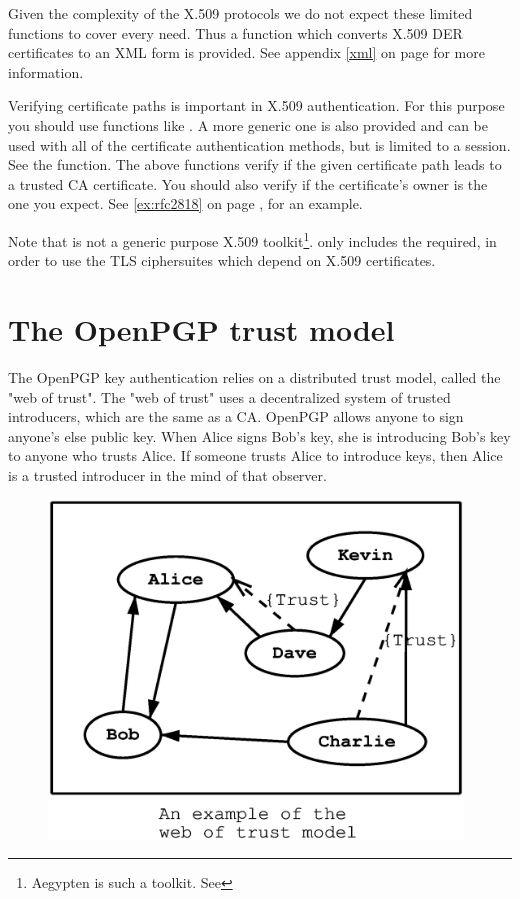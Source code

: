 Given the complexity of the X.509 protocols we do not expect these limited 
functions to cover every need. Thus a function which converts X.509 DER certificates
to an XML form is provided. See appendix \ref{xml} on page \pageref{xml} for
more information.


\par
Verifying certificate paths is important 
in X.509 authentication. For this purpose you should use functions like
.
A more generic one is also provided and can be used with all
of the certificate authentication methods, but is limited to a session. See the
function. The above functions verify if the given certificate path leads
to a trusted CA certificate. You should also verify if the certificate's
owner is the one you expect. See \ref{ex:rfc2818} on page \pageref{ex:rfc2818},
for an example.

\par
Note that \gnutls{} is not a generic purpose X.509 toolkit\footnote{Aegypten is such a toolkit. See 
}. 
\gnutls{} only includes the required,
in order to use the TLS ciphersuites which depend on X.509 certificates.


\section{The OpenPGP trust model}
\label{pgp:trust}

The OpenPGP key authentication relies on a distributed trust model, called
the "web of trust". The "web of trust" uses a decentralized system of 
trusted introducers, which are the same as a CA. OpenPGP allows anyone to 
sign anyone's else public key. When Alice signs Bob's key, she is introducing 
Bob's key to anyone who trusts Alice. If someone trusts Alice to introduce
keys, then Alice is a trusted introducer in the mind of that observer.

\begin{figure}[hbtp]
\includegraphics[height=9cm,width=11cm]{pgp-fig1}
\label{fig:pgp1}
\end{figure}

